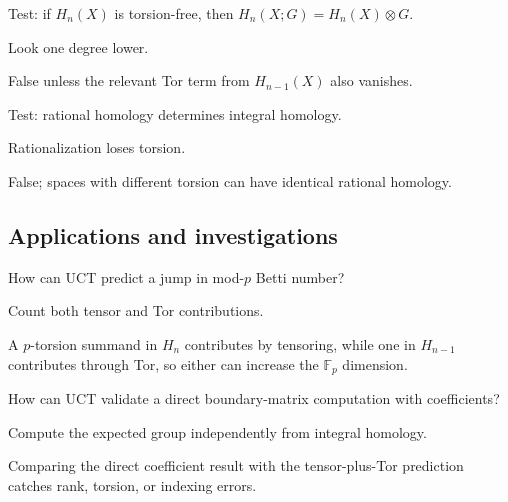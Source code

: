 \begin{exercise}\label{exr:viii26-ped-11}
Test: if $H_n(X)$ is torsion-free, then $H_n(X;G)=H_n(X)\otimes G$.
\end{exercise}
\begin{hint}
Look one degree lower.
\end{hint}
\begin{solution}
False unless the relevant Tor term from $H_{n-1}(X)$ also vanishes.
\end{solution}

\begin{exercise}\label{exr:viii26-ped-12}
Test: rational homology determines integral homology.
\end{exercise}
\begin{hint}
Rationalization loses torsion.
\end{hint}
\begin{solution}
False; spaces with different torsion can have identical rational homology.
\end{solution}

\subsection*{Applications and investigations}

\begin{exercise}\label{exr:viii26-ped-13}
How can UCT predict a jump in mod-$p$ Betti number?
\end{exercise}
\begin{hint}
Count both tensor and Tor contributions.
\end{hint}
\begin{solution}
A $p$-torsion summand in $H_n$ contributes by tensoring, while one in $H_{n-1}$ contributes through Tor, so either can increase the $\mathbb F_p$ dimension.
\end{solution}

\begin{exercise}\label{exr:viii26-ped-14}
How can UCT validate a direct boundary-matrix computation with coefficients?
\end{exercise}
\begin{hint}
Compute the expected group independently from integral homology.
\end{hint}
\begin{solution}
Comparing the direct coefficient result with the tensor-plus-Tor prediction catches rank, torsion, or indexing errors.
\end{solution}

